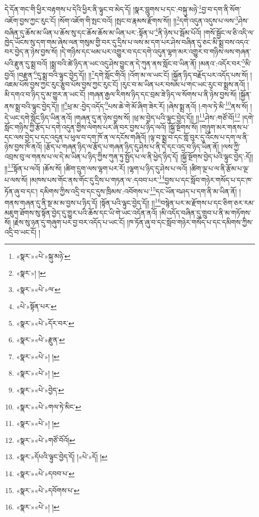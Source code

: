 དེ་དོན་གང་གི་ཕྱིར་བརྟགས་པ་དེའི་ཕྱིར་ནི་ལྟུང་བ་མེད་དོ། །སྣར་བླུགས་པ་དང་:བསྐུ་མཉེ་\footnote{«སྣར་»«པེ་»སྐུ་མཉེ་}བྱ་བ་དག་ནི་སོག་འཇོག་བྱས་ཀྱང་རུང་ངོ། །སོག་འཇོག་གི་སྤང་བའོ། །སྤང་བ་རྣམས་རྫོགས་སོ།། །།\footnote{«སྣར་»། །}དགེ་འདུན་འདུས་པ་ལས་\footnote{«སྣར་»«པེ་»ལ་}ཤེས་བཞིན་དུ་ཆོས་མ་ཡིན་པ་ཆོས་སུ་དང་ཆོས་ཆོས་མ་ཡིན་པར་:སྟོན་པ་\footnote{«པེ་»སྟོན་པར་}ནི་ཉེས་པ་སྦོམ་པོའོ། །གསོ་སྦྱོང་ལ་ཅི་འདི་ལ་ཁྱེད་ཡོངས་སུ་དག་གམ་ཞེས་ལན་གསུམ་གྱི་བར་དུ་དྲིས་པ་ལས་མ་དག་པར་ཤེས་བཞིན་དུ་ཅང་མི་སྨྲ་བས་འདའ་བར་བྱེད་ན་ཉེས་བྱས་སོ། །དེ་གཉིས་དང་ཕམ་པར་འགྱུར་བ་དང་དགེ་འདུན་ལྷག་མར་འགྱུར་བ་གཉིས་ལས་གཞན་པའི་རྫུན་དུ་སྨྲ་བའོ། །སྨྲ་བའི་ཚེ་ཉིད་ན་ཡང་འདུ་ཤེས་བྱུང་ན་དེ་ཀུན་ནས་སློང་བ་ཡིན་ནོ། །མནའ་:འདོར་བར་\footnote{«སྣར་»«པེ་»དོར་བར་}མི་བྱའོ། །བརྫུན་\footnote{«སྣར་»«པེ་»རྫུན་}དུ་སྨྲ་བའི་ལྟུང་བྱེད་དོ།། །།\footnote{«སྣར་»«པེ་»། །}དགེ་སློང་གིའོ། །འོག་མ་ལ་ཡང་ངོ། །སྐྱོན་ཉིད་བརྗོད་པར་འདོད་པས་སོ། །འཇམ་པོས་བྱས་ཀྱང་རུང་རྩུབ་པོས་བྱས་ཀྱང་རུང་ངོ། །རུང་བ་མ་ཡིན་པར་བསམ་པ་གང་ཡང་རུང་བ་སྨྲས་ནའོ། །མི་དགའ་བ་ཉིད་དུ་མ་གྱུར་ན་ཡང་ངོ། །གཞན་རྒྱལ་རིགས་ཉིད་དང་བྲམ་ཟེ་ཉིད་ལ་སོགས་པ་ནི་ཉེས་བྱས་སོ། །སྐྱོན་ནས་སྨྲ་བའི་ལྟུང་བྱེད་དོ།། །།\footnote{«སྣར་»«པེ་»། །}ཕྲ་མ་:བྱེད་འདོད་\footnote{«སྣར་»«པེ་»བྱེད་}པས་ཆེ་གེ་མོ་ཞིག་ཟེར་རོ། །ཞེས་སྨྲ་ནའོ། །:གལ་ཏེ་མི་\footnote{«སྣར་»«པེ་»གལ་ཏེ་མིང་}ནས་སོ། །དེ་ཡང་དགེ་སློང་ཉིད་ཡིན་ནའོ། །གཞན་དུ་ན་ཉེས་བྱས་སོ། །ཕྲ་མ་བྱེད་པའི་ལྟུང་བྱེད་དོ།། །།\footnote{«སྣར་»«པེ་»། །}ཤེས་:གཙོ་བོ།\footnote{«སྣར་»«པེ་»གཙོ་བོའོ།} །དགེ་སློང་གཉིས་ཀྱི་རྩོད་པ་དགེ་འདུན་གྱིས་ལེགས་པར་ཞི་བར་བྱས་པ་ཉིད་ལའོ། །སྐྱོ་སྔོགས་སོ། །གཉུག་མར་གནས་པ་དང་ལས་བྱེད་པ་དང་འདུན་པ་ཕུལ་བ་དག་ཁོ་ན་ལ་དངོས་གཞིའོ། །ལྟ་བ་སྨྲ་བ་དང་གློ་བུར་དུ་འོངས་པ་དག་ལ་ནི་ཉེས་བྱས་ཁོ་ནའོ། །རྩོད་པ་གཞན་ཉིད་ལ་རྩོད་པ་གཞན་ཉིད་དུ་ཤེས་པ་ནི་དེ་དང་འདྲ་བ་ཉིད་ཡིན་ནོ། །ལས་ཀྱི་འབྲས་བུ་ལ་གནས་པ་ལ་དེ་མ་ཡིན་པ་ཉིད་ཀྱིས་ཀུན་ཏུ་སྤྱོད་པ་ལ་ནི་ཕྱེད་ཉིད་དོ། །སྐྱོ་སྔོགས་བྱེད་པའི་ལྟུང་བྱེད་:དོ།། །།\footnote{«སྣར་»དོཔའི་ལྟུང་བྱེད་དོ། །«པེ་»དོ། །}སྟོན་པ་ལའོ། །ཆོས་སོ། །ཚིག་དྲུག་ལས་ལྷག་པར་རོ། །ལྷག་པ་ཉིད་དུ་ཤེས་པ་ལའོ། །ཚིག་ལྔ་པ་ལ་ནི་རྩོམ་པ་ལྔ་པ་ལས་སོ། །མཁས་པས་གོང་ནས་གོང་དུ་དྲིས་པ་གཏན་ལ་:དབབ་པར་\footnote{«སྣར་»«པེ་»དབབ་པ་}བྱས་པ་དང་སློབ་གཉེར་གསོད་པ་དང་ཁ་ཏོན་ཞུ་བ་དང་། དམིགས་ཀྱིས་འདྲི་བ་དང་དུས་ཁྲིམས་:འབོགས་པ་\footnote{«སྣར་»«པེ་»དབོགས་པ་}དང་ཡོན་བཤད་པ་དག་ནི་མ་ཡིན་ནོ། །གནས་གཞན་དུ་ནི་སྔ་མ་མ་བྱས་པ་ཉིད་དོ། །སྟོན་པའི་ལྟུང་བྱེད་དོ།། །།\footnote{«སྣར་»«པེ་»། །}བསྙེན་པར་མ་རྫོགས་པ་དང་ཅིག་ཅར་རམ་མཇུག་ཐོགས་སུ་སྟོན་བྱེད་དུ་གྱུར་པའི་ཆོས་དང་ཡི་གེ་ཡང་འདོན་ནའོ། །མི་འདོད་བཞིན་དུ་གྲུབ་པ་ནི་མ་གཏོགས་སོ། །རྗེས་སུ་ཉན་དུ་གཞུག་པར་བྱ་བར་འདོད་པ་ཡང་ངོ། །ཁ་ཏོན་ཞུ་བ་དང་སློབ་གཉེར་གསོད་པ་དང་དམིགས་ཀྱིས་འདྲི་བ་ཡང་ངོ། །
